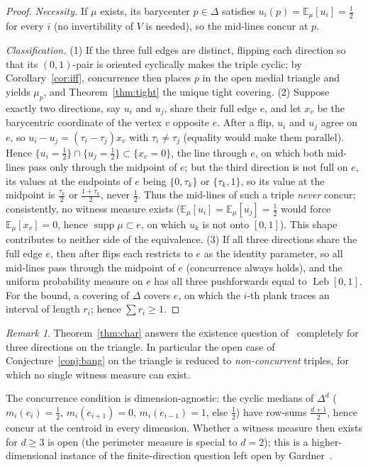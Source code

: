 \documentclass[11pt,reqno]{amsart}
\theoremstyle{plain}
\theoremstyle{definition}
\theoremstyle{remark}
\newtheorem{remark}[theorem]{Remark}
\newcommand{\Leb}{\operatorname{Leb}}
\begin{document}
\begin{proof}
\emph{Necessity.} If $\mu$ exists, its barycenter $p\in\Delta$ satisfies
$u_i(p)=\mathbb E_\mu[u_i]=\tfrac12$ for every $i$ (no invertibility of $V$ is
needed), so the mid-lines concur at $p$.

\emph{Classification.} (1) If the three full edges are distinct, flipping each
direction so that its $(0,1)$-pair is oriented cyclically makes the triple
cyclic; by Corollary~\ref{cor:iff}, concurrence then places $p$ in the open
medial triangle and yields $\mu_p$, and Theorem~\ref{thm:tight} the unique
tight covering. (2) Suppose exactly two directions, say $u_i$ and $u_j$, share
their full edge $e$, and let $x_v$ be the barycentric coordinate of the vertex
$v$ opposite $e$. After a flip, $u_i$ and $u_j$ agree on $e$, so
$u_i-u_j=(\tau_i-\tau_j)x_v$ with $\tau_i\ne\tau_j$ (equality would make them
parallel). Hence $\{u_i=\tfrac12\}\cap\{u_j=\tfrac12\}\subset\{x_v=0\}$, the
line through $e$, on which both mid-lines pass only through the midpoint of
$e$; but the third direction is not full on $e$, its values at the endpoints of
$e$ being $\{0,\tau_k\}$ or $\{\tau_k,1\}$, so its value at the midpoint is
$\tfrac{\tau_k}2$ or $\tfrac{1+\tau_k}2$, never $\tfrac12$. Thus the mid-lines
of such a triple \emph{never} concur; consistently, no witness measure exists
($\mathbb E_\mu[u_i]=\mathbb E_\mu[u_j]=\tfrac12$ would force
$\mathbb E_\mu[x_v]=0$, hence $\operatorname{supp}\mu\subset e$, on which $u_k$
is not onto $[0,1]$). This shape contributes to neither side of the
equivalence. (3) If all three directions share the full edge $e$, then after
flips each restricts to $e$ as the identity parameter, so all mid-lines pass
through the midpoint of $e$ (concurrence always holds), and the uniform
probability measure on $e$ has all three pushforwards equal to $\Leb[0,1]$.
For the bound, a covering of $\Delta$ covers $e$, on which the $i$-th plank
traces an interval of length $r_i$; hence $\sum r_i\ge1$.
\end{proof}

\begin{remark}
Theorem~\ref{thm:char} answers the existence question of~\cite{Gardner88}
completely for three directions on the triangle. In particular the open case of
Conjecture~\ref{conj:bang} on the triangle is reduced to \emph{non-concurrent}
triples, for which no single witness measure can exist.
\end{remark}

\smallskip
The concurrence condition is dimension-agnostic: the cyclic medians of $\Delta^d$
($m_i(e_i)=\tfrac12$, $m_i(e_{i+1})=0$, $m_i(e_{i-1})=1$, else $\tfrac12$) have
row-sums $\tfrac{d+1}2$, hence concur at the centroid in every dimension. Whether a
witness measure then exists for $d\ge3$ is open (the perimeter measure is special to
$d=2$); this is a higher-dimensional instance of the finite-direction question left
open by Gardner~\cite{Gardner88}.
\end{document}
